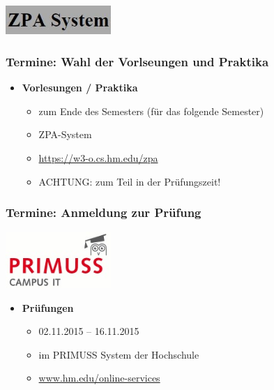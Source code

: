 \documentclass{beamer}
\begin{document}
    \begin{frame}
    	\flushright
    	\includegraphics[width=0.3\textwidth]{zpa.jpg}
    	\frametitle{Termine: Wahl der Vorlseungen und Praktika}
    	\begin{itemize}
    		\item \textbf{Vorlesungen / Praktika}
    		\begin{itemize}
    			\item zum Ende des Semesters (für das folgende Semester)
    			\item ZPA-System
    			\item \url{https://w3-o.cs.hm.edu/zpa}
    			\item ACHTUNG: zum Teil in der Prüfungszeit!
    		\end{itemize}
    	\end{itemize}
    \end{frame}
    
    \begin{frame}
    	\frametitle{Termine: Anmeldung zur Prüfung}
    	\flushright
    	\includegraphics[width=0.3\textwidth]{primuss.jpg}
    	\begin{itemize}
    		\item \textbf{Prüfungen}
    		\begin{itemize}
    			\item 02.11.2015 – 16.11.2015
    			\item im PRIMUSS System der Hochschule
    			\item \url{www.hm.edu/online-services}
    		\end{itemize}
    	\end{itemize}
    \end{frame}
    
\end{document}
